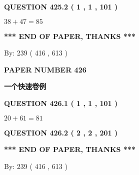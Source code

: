 \documentclass{ctexart}
\begin{document}
{\textbf{\Large{QUESTION
425.2 
 ( 1 , 1 , 101 )
}}}
  
  
 
 

$ %
38 +  %
47=   %
85$
 
 
   
   
 \vspace{0.2in}
 
   
   
   
   
\vspace{1.0in} 
{\textbf{\large{ *** END OF PAPER, THANKS *** }}} 
   
   
\hspace{1.0in} By: 
 239 ( 416 ,  613 )
   
   
   
   
\newpage 
\setcounter{page}{ 
   426001 } 
   
   
   
   
 {\textbf{ \Large{ PAPER NUMBER  426  }}}
   
   
\vspace{0.2in}
   
   
   
   
   
   
 \vspace{0.2in}
{\LARGE {\textbf{ 一个快速卷例}}}
   
   
  
\vspace{0.2in}
  
{\textbf{\Large{QUESTION
426.1 
 ( 1 , 1 , 101 )
}}}
  
  
 
 

$ %
20 +  %
61=   %
81$
 
 
  
\vspace{0.2in}
  
{\textbf{\Large{QUESTION
426.2 
 ( 2 , 2 , 201 )
}}}
  
  
   
   
 \vspace{0.2in}
 
   
   
   
   
\vspace{1.0in} 
{\textbf{\large{ *** END OF PAPER, THANKS *** }}} 
   
   
\hspace{1.0in} By: 
 239 ( 416 ,  613 )
   
\end{document}
